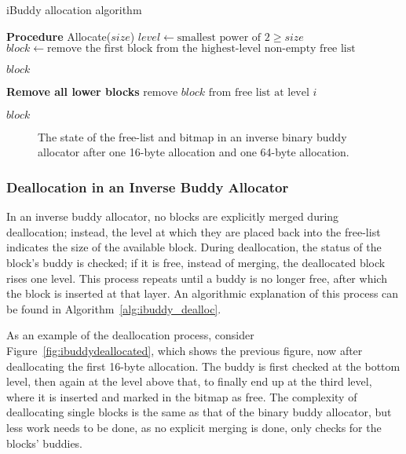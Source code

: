 \begin{algorithm}[h]
  \caption{iBuddy allocation algorithm}
  \label{alg:ibuddy_alloc}
  \begin{algorithmic}[1]
    \Statex \textbf{Procedure} Allocate($size$)
    \State $level \gets \text{smallest power of 2} \geq size$
    \State $block \gets \text{remove the first block from the highest-level non-empty free list}$

    \State \Return $block$
    \State \Return {}
    \EndIf

    \Statex \textbf{Remove all lower blocks}
    \State $\text{remove } block \text{ from free list at level } i$
    \EndFor
    \EndFor

    \State \Return $block$
  \end{algorithmic}
\end{algorithm}

\begin{figure}[h]
  \centering
  
  \caption{The state of the free-list and bitmap in an inverse binary buddy allocator after one 16-byte allocation and one 64-byte allocation.}
  \label{fig:ibuddyallocated2}
\end{figure}
    
\FloatBarrier
\subsubsection{Deallocation in an Inverse Buddy Allocator}
In an inverse buddy allocator, no blocks are explicitly merged during deallocation; instead, the level at which they are placed back into the free-list indicates the size of the available block. During deallocation, the status of the block's buddy is checked; if it is free, instead of merging, the deallocated block rises one level. This process repeats until a buddy is no longer free, after which the block is inserted at that layer. An algorithmic explanation of this process can be found in Algorithm~\ref{alg:ibuddy_dealloc}.

As an example of the deallocation process, consider Figure~\ref{fig:ibuddydeallocated}, which shows the previous figure, now after deallocating the first 16-byte allocation. The buddy is first checked at the bottom level, then again at the level above that, to finally end up at the third level, where it is inserted and marked in the bitmap as free. The complexity of deallocating single blocks is the same as that of the binary buddy allocator, but less work needs to be done, as no explicit merging is done, only checks for the blocks' buddies.

